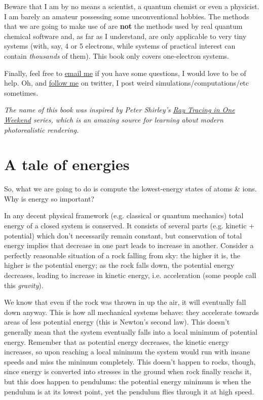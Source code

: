 \documentclass{article}
\begin{document}
Beware that I am by no means a scientist, a quantum chemist or even a physicist. I am barely an amateur possessing some unconventional hobbies. The methods that we are going to make use of are \textbf{not} the methods used by real quantum chemical software and, as far as I understand, are only applicable to very tiny systems (with, say, 4 or 5 electrons, while systems of practical interest can contain \textit{thousands} of them). This book only covers one-electron systems.

Finally, feel free to \href{mailto:lisyarus@gmail.com}{email me} if you have some questions, I would love to be of help. Oh, and \href{https://twitter.com/lisyarus}{follow me} on twitter, I post weird simulations/computations/etc sometimes.

\bigbreak
\textit{The name of this book was inspired by Peter Shirley's \href{https://raytracing.github.io}{Ray Tracing in One Weekend} series, which is an amazing source for learning about modern photorealistic rendering.}

\section{A tale of energies}

So, what we are going to do is compute the lowest-energy states of atoms \& ions. Why is energy so important?

In any decent physical framework (e.g. classical or quantum mechanics) total energy of a closed system is conserved. It consists of several parts (e.g. kinetic + potential) which don't necessarily remain constant, but conservation of total energy implies that decrease in one part leads to increase in another. Consider a perfectly reasonable situation of a rock falling from sky: the higher it is, the higher is the potential energy; as the rock falls down, the potential energy decreases, leading to increase in kinetic energy, i.e. acceleration (some people call this \textit{gravity}).

We know that even if the rock was thrown in up the air, it will eventually fall down anyway. This is how all mechanical systems behave: they accelerate towards areas of less potential energy (this is Newton's second law). This doesn't generally mean that the system eventually falls into a local minimum of potential energy. Remember that as potential energy decreases, the kinetic energy increases, so upon reaching a local minimum the system would run with insane speeds and miss the minimum completely. This doesn't happen to rocks, though, since energy is converted into stresses in the ground when rock finally reachs it, but this does happen to pendulums: the potential energy minimum is when the pendulum is at its lowest point, yet the pendulum flies through it at high speed.
\end{document}
